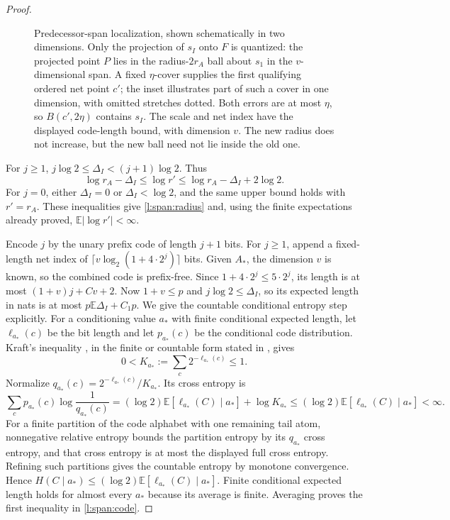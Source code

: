 \begin{proof}
\begin{figure}[htbp]
\caption{Predecessor-span localization, shown schematically in two
dimensions. Only the projection of \(s_I\) onto \(F\) is quantized:
the projected point \(P\) lies in the radius-\(2r_A\) ball about
\(s_1\) in the \(v\)-dimensional span. A fixed \(\eta\)-cover supplies
the first qualifying ordered net point \(c'\); the inset illustrates
part of such a cover in one dimension, with omitted stretches dotted.
Both errors are at most \(\eta\), so \(B(c',2\eta)\) contains \(s_I\).
The scale and net index have the displayed code-length bound, with
dimension \(v\). The new radius does not increase, but the new ball
need not lie inside the old one.}
\label{l:span:net-figure}
\end{figure}

For \(j\ge1\),
\(j\log2\le\Delta_I<(j+1)\log2\).  Thus
\[
 \log r_A-\Delta_I\le \log r'
       \le\log r_A-\Delta_I+2\log2.
\]
For \(j=0\), either \(\Delta_I=0\) or \(\Delta_I<\log2\), and the
same upper bound holds with \(r'=r_A\).  These inequalities give
\eqref{l:span:radius} and, using the finite expectations already
proved, \(\mathbb E|\log r'|<\infty\).

Encode \(j\) by the unary prefix code of length \(j+1\) bits.
For \(j\ge1\), append a fixed-length net index of
\(\lceil v\log_2(1+4\cdot2^j)\rceil\) bits.  Given \(A_*\), the
dimension \(v\) is known, so the combined code is prefix-free.
Since \(1+4\cdot2^j\le5\cdot2^j\), its length is at most
\((1+v)j+C v+2\).  Now \(1+v\le p\) and
\(j\log2\le\Delta_I\), so its expected length in nats is at most
\(p\mathbb E\Delta_I+C_1p\).  We give the countable conditional
entropy step explicitly.  For a conditioning value \(a_*\) with finite
conditional expected length, let \(\ell_{a_*}(c)\) be the bit length
and let \(p_{a_*}(c)\) be the conditional code distribution.  Kraft's
inequality \cite{Kraft1949}, in the finite or countable form stated in
\cite[Section~2.4.2, Theorem~2.4.2]{Duchi2023}, gives
\[
 0<K_{a_*}:=\sum_c2^{-\ell_{a_*}(c)}\le1.
\]
Normalize \(q_{a_*}(c)=2^{-\ell_{a_*}(c)}/K_{a_*}\).  Its cross entropy is
\[
 \sum_c p_{a_*}(c)\log\frac1{q_{a_*}(c)}
 =(\log2)\mathbb E[\ell_{a_*}(C)\mid a_*]+\log K_{a_*}
 \le(\log2)\mathbb E[\ell_{a_*}(C)\mid a_*]<\infty.
\]
For a finite partition of the code alphabet with one remaining tail
atom, nonnegative relative entropy bounds the partition entropy by
its \(q_{a_*}\) cross entropy, and that cross entropy is at most the
displayed full cross entropy.  Refining such partitions gives the
countable entropy by monotone convergence.  Hence
\(H(C\mid a_*)\le(\log2)\mathbb E[\ell_{a_*}(C)\mid a_*]\).
Finite conditional expected length holds for almost every \(a_*\)
because its average is finite.  Averaging proves the first inequality
in \eqref{l:span:code}.


\end{proof}
